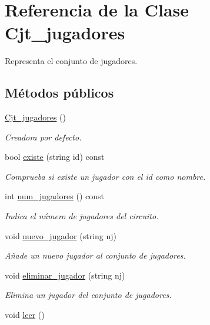 \hypertarget{class_cjt__jugadores}{}\section{Referencia de la Clase Cjt\+\_\+jugadores}
\label{class_cjt__jugadores}


Representa el conjunto de jugadores.  


\subsection*{Métodos públicos}
\begin{DoxyCompactItemize}
\item 
\hyperlink{class_cjt__jugadores_af40661f610000ab6febf3ea0de7a451b}{Cjt\+\_\+jugadores} ()
\begin{DoxyCompactList}\small\item\em Creadora por defecto. \end{DoxyCompactList}\item 
bool \hyperlink{class_cjt__jugadores_a90a090845d242dd1f7dddf2d19467592}{existe} (string id) const
\begin{DoxyCompactList}\small\item\em Comprueba si existe un jugador con el id como nombre. \end{DoxyCompactList}\item 
int \hyperlink{class_cjt__jugadores_a4951d7691e67c44415fdcb3119dd4148}{num\+\_\+jugadores} () const
\begin{DoxyCompactList}\small\item\em Indica el número de jugadores del circuito. \end{DoxyCompactList}\item 
void \hyperlink{class_cjt__jugadores_a99640dbf83c833ed484d1bc31a36ede1}{nuevo\+\_\+jugador} (string nj)
\begin{DoxyCompactList}\small\item\em Añade un nuevo jugador al conjunto de jugadores. \end{DoxyCompactList}\item 
void \hyperlink{class_cjt__jugadores_ac0783e7a2a952975cd339f69cb040b30}{eliminar\+\_\+jugador} (string nj)
\begin{DoxyCompactList}\small\item\em Elimina un jugador del conjunto de jugadores. \end{DoxyCompactList}\item 
void \hyperlink{class_cjt__jugadores_a625e1ba48fc2f9b7c868820e1dc417f1}{leer} ()

\end{DoxyCompactItemize}
